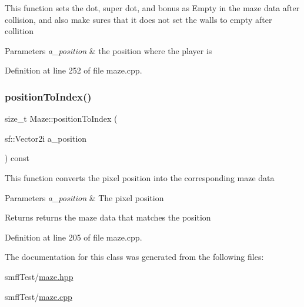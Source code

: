 This function sets the dot, super dot, and bonus as Empty in the maze data after collision, and also make sures that it does not set the walls to empty after collition


\begin{DoxyParams}{Parameters}
{\em a\+\_\+position} & the position where the player is \\
\hline
\end{DoxyParams}


Definition at line 252 of file maze.\+cpp.

\mbox{\label{class_maze_abae2881894d0dcc53d179f74cc7aa3bd}} 
\subsubsection{\texorpdfstring{position\+To\+Index()}{positionToIndex()}}
{\footnotesize\ttfamily size\+\_\+t Maze\+::position\+To\+Index (\begin{DoxyParamCaption}\item[{sf\+::\+Vector2i}]{a\+\_\+position }\end{DoxyParamCaption}) const\hspace{0.3cm}{\ttfamily [inline]}}

This function converts the pixel position into the corresponding maze data


\begin{DoxyParams}{Parameters}
{\em a\+\_\+position} & The pixel position \\
\hline
\end{DoxyParams}
\begin{DoxyReturn}{Returns}
returns the maze data that matches the position 
\end{DoxyReturn}


Definition at line 205 of file maze.\+cpp.



The documentation for this class was generated from the following files\+:\begin{DoxyCompactItemize}
\item 
smfl\+Test/\hyperlink{maze_8hpp}{maze.\+hpp}\item 
smfl\+Test/\hyperlink{maze_8cpp}{maze.\+cpp}\end{DoxyCompactItemize}
